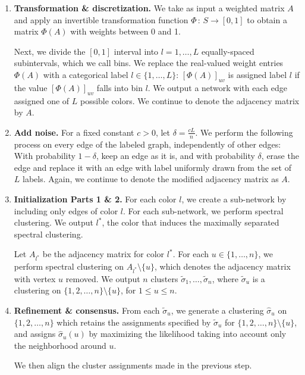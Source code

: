 \documentclass{article}
\begin{document}
\begin{enumerate}
\item \textbf{Transformation \& discretization.} We take as input a weighted matrix $A$ and apply an invertible transformation function $\Phi \,:\, S \rightarrow [0,1]$ to obtain a matrix $\Phi(A)$ with weights between 0 and 1.

Next, we divide the $[0,1]$ interval into $l=1, \dots, L$ equally-spaced subintervals, which we call bins. We replace the real-valued weight entries $\Phi(A)$ with a categorical label $l \in \{1, \dots, L\}$: $[\Phi(A)]_{uv}$ is assigned label $l$ if the value $[\Phi(A)]_{uv}$ falls into bin $l$. We output a network with each edge assigned one of $L$ possible colors. We continue to denote the adjacency matrix by $A$.

\item \textbf{Add noise.} For a fixed constant $c > 0$, let $\delta = \frac{cL}{n}$. We perform the following process on every edge of the labeled graph, independently of other edges: With probability $1-\delta$, keep an edge as it is, and with probability $\delta$, erase the edge and replace it with an edge with label uniformly drawn from the set of $L$ labels. Again, we continue to denote the modified adjacency matrix as $A$.

\item \textbf{Initialization Parts 1 \& 2.} For each color $l$, we create a sub-network by including only edges of color $l$. For each sub-network, we perform spectral clustering. We output $l^*$, the color that induces the maximally separated spectral clustering. 

Let $A_{l^*}$ be the adjacency matrix for color $l^*$. For each $u \in \{1, \dots, n\}$, we perform spectral clustering on $A_{l^*} \setminus \{u\}$, which denotes the adjacency matrix with vertex $u$ removed. We output $n$ clusters $\tilde{\sigma}_1, \dots, \tilde{\sigma}_n$, where $\tilde \sigma_u$ is a clustering on $\{1, 2, \dots, n\} \setminus \{u\}$, for $1 \leq u \leq n$.

\item \textbf{Refinement \& consensus.} From each $\tilde \sigma_u$, we generate a clustering $\hat \sigma_u$ on $\{1, 2, \dots, n\}$ which retains the assignments specified by $\tilde \sigma_u$ for $\{1, 2, \dots, n\} \setminus \{u\}$, and assigns $\hat \sigma_u(u)$ by maximizing the likelihood taking into account only the neighborhood around $u$. 

We then align the cluster assignments made in the previous step. 
\end{enumerate}
\end{document}
